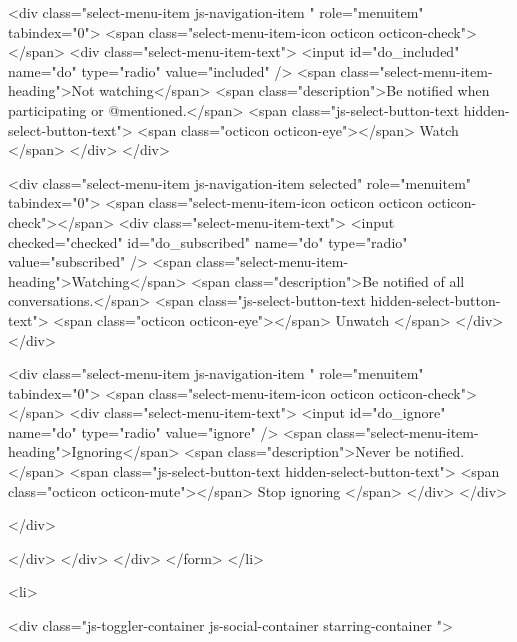                 <div class="select-menu-item js-navigation-item " role="menuitem" tabindex="0">
                  <span class="select-menu-item-icon octicon octicon-check"></span>
                  <div class="select-menu-item-text">
                    <input id="do_included" name="do" type="radio" value="included" />
                    <span class="select-menu-item-heading">Not watching</span>
                    <span class="description">Be notified when participating or @mentioned.</span>
                    <span class="js-select-button-text hidden-select-button-text">
                      <span class="octicon octicon-eye"></span>
                      Watch
                    </span>
                  </div>
                </div>

                <div class="select-menu-item js-navigation-item selected" role="menuitem" tabindex="0">
                  <span class="select-menu-item-icon octicon octicon octicon-check"></span>
                  <div class="select-menu-item-text">
                    <input checked="checked" id="do_subscribed" name="do" type="radio" value="subscribed" />
                    <span class="select-menu-item-heading">Watching</span>
                    <span class="description">Be notified of all conversations.</span>
                    <span class="js-select-button-text hidden-select-button-text">
                      <span class="octicon octicon-eye"></span>
                      Unwatch
                    </span>
                  </div>
                </div>

                <div class="select-menu-item js-navigation-item " role="menuitem" tabindex="0">
                  <span class="select-menu-item-icon octicon octicon-check"></span>
                  <div class="select-menu-item-text">
                    <input id="do_ignore" name="do" type="radio" value="ignore" />
                    <span class="select-menu-item-heading">Ignoring</span>
                    <span class="description">Never be notified.</span>
                    <span class="js-select-button-text hidden-select-button-text">
                      <span class="octicon octicon-mute"></span>
                      Stop ignoring
                    </span>
                  </div>
                </div>

              </div>

            </div>
          </div>
        </div>
</form>
  </li>

  <li>
    
  <div class="js-toggler-container js-social-container starring-container ">

